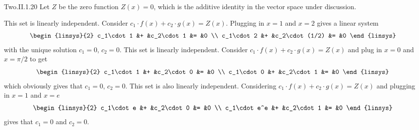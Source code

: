 \begin{ans}{Two.II.1.20}
      Let $Z$ be the zero function $Z(x)=0$, which is the additive identity in
      the vector space under discussion.
      \begin{exparts}
        \partsitem This set is linearly independent.
          Consider \( c_1\cdot f(x)+c_2\cdot g(x)=Z(x) \).
          Plugging in \( x=1 \) and \( x=2 \) gives a linear system
          \begin{equation*}
            \begin{linsys}{2}
              c_1\cdot 1  &+  &c_2\cdot 1     &=  &0  \\
              c_1\cdot 2  &+  &c_2\cdot (1/2) &=  &0
            \end{linsys}
          \end{equation*}
          with the unique solution \( c_1=0 \), \( c_2=0 \).
        \partsitem This set is linearly independent.
          Consider \( c_1\cdot f(x)+c_2\cdot g(x)=Z(x) \) and
          plug in \( x=0 \) and \( x=\pi/2 \) to get
          \begin{equation*}
            \begin{linsys}{2}
              c_1\cdot 1  &+  &c_2\cdot 0     &=  &0  \\
              c_1\cdot 0  &+  &c_2\cdot 1     &=  &0
            \end{linsys}
          \end{equation*}
          which obviously gives that \( c_1=0 \), \( c_2=0 \).
        \partsitem This set is also linearly independent.
          Considering \( c_1\cdot f(x)+c_2\cdot g(x)=Z(x) \) and
          plugging in \( x=1 \) and \( x=e \)
          \begin{equation*}
            \begin{linsys}{2}
              c_1\cdot e    &+  &c_2\cdot 0     &=  &0  \\
              c_1\cdot e^e  &+  &c_2\cdot 1     &=  &0
            \end{linsys}
          \end{equation*}
          gives that \( c_1=0 \) and \( c_2=0 \).
      \end{exparts}
     
\end{ans}
